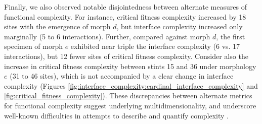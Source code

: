 Finally, we also observed notable disjointedness between alternate measures of functional complexity.
For instance, critical fitness complexity increased by 18 sites with the emergence of morph $d$, but interface complexity increased only marginally (5 to 6 interactions).
Further, compared against morph $d$, the first specimen of morph $e$ exhibited near triple the interface complexity (6 vs. 17 interactions), but 12 fewer sites of critical fitness complexity.
Consider also the increase in critical fitness complexity between stints 15 and 36 under morphology $e$ (31 to 46 sites), which is not accompanied by a clear change in interface complexity (Figures \ref{fig:interface_complexity:cardinal_interface_complexity} and \ref{fig:critical_fitness_complexity}).
These discrepancies between alternate metrics for functional complexity suggest underlying multidimensionality, and underscore well-known difficulties in attempts to describe and quantify complexity \citep{bottcher2018molecules}.
